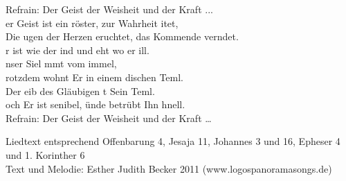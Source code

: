 Refrain:              Der Geist der Weisheit und der Kraft ...\\

er Geist ist ein röster,  zur Wahrheit itet,\\
Die ugen der Herzen eruchtet, das Kommende verndet.\\
r ist wie der ind und eht wo er ill.\\
nser Siel mmt vom immel,\\
rotzdem wohnt Er in einem dischen Teml.\\
Der eib des Gläubigen t Sein Teml.\\
och Er ist senibel, ünde betrübt Ihn hnell.\\


Refrain:             Der Geist der Weisheit und der Kraft …\\
 
\begin{footnotesize}
Liedtext entsprechend Offenbarung 4, Jesaja 11, Johannes 3 und 16, Epheser 4 und 1. Korinther 6 \\
Text und Melodie: Esther Judith Becker 2011 (www.logospanoramasongs.de)
\end{footnotesize}